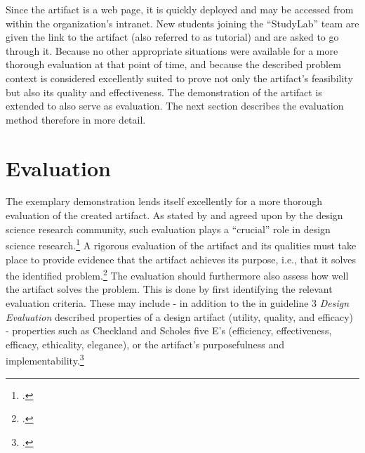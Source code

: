 Since the artifact is a web page, it is quickly deployed and may be accessed from within the organization's intranet. New students joining the \enquote{StudyLab} team are given the link to the artifact (also referred to as tutorial) and are asked to go through it. Because no other appropriate situations were available for a more thorough evaluation at that point of time, and because the described problem context is considered excellently suited to prove not only the artifact's feasibility but also its quality and effectiveness. The demonstration of the artifact is extended to also serve as evaluation. The next section describes the evaluation method therefore in more detail.


\section{Evaluation} \label{sec:Evaluation}

The exemplary demonstration lends itself excellently for a more thorough evaluation of the created artifact. As stated by \cite{HevnerDesignScienceResearch2004} and agreed upon by the design science research community, such evaluation plays a \enquote{crucial} role in design science research.\footcites[Cf.][p.258]{MarchDesignnaturalscience1995}[Cf. in addition][]{PfeffersDesignScienceResearch2007}{HevnerDesignScienceResearch2004}{Pries-HejeComprehensiveFrameworkEvaluation2012}{Pries-HejeStrategiesDesignScience} A rigorous evaluation of the artifact and its qualities must take place to provide evidence that the artifact achieves its purpose, i.e., that it solves the identified problem.\footcites[Cf.][p.425]{Pries-HejeComprehensiveFrameworkEvaluation2012} The evaluation should furthermore also assess how well the artifact solves the problem. This is done by first identifying the relevant evaluation criteria. These may include - in addition to the in guideline 3 \textit{Design Evaluation} described properties of a design artifact (utility, quality, and efficacy) - properties such as Checkland and Scholes five E's (efficiency, effectiveness, efficacy, ethicality, elegance), or the artifact's purposefulness and implementability.\footcites[Cf.][p.427]{Pries-HejeComprehensiveFrameworkEvaluation2012}[cf. in addition][]{ChecklandSoftSystemsMethodology1990}

